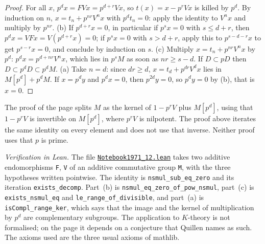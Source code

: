 \begin{proof}
For all $x$, $p^dx = FVx = p^{d+r}Vx$, so $t(x) = x - p^rVx$ is killed by $p^d$. By induction on $n$, $x = t_n + p^{nr}V^nx$ with $p^dt_n = 0$: apply the identity to $V^nx$ and multiply by $p^{nr}$. (b) If $p^{d+r}x = 0$, in particular if $p^sx = 0$ with $s \le d + r$, then $p^dx = VFx = V(p^{d+r}x) = 0$; if $p^sx = 0$ with $s > d + r$, apply this to $p^{s-d-r}x$ to get $p^{s-r}x = 0$, and conclude by induction on $s$. (c) Multiply $x = t_n + p^{nr}V^nx$ by $p^d$: $p^dx = p^{d+nr}V^nx$, which lies in $p^sM$ as soon as $nr \ge s - d$. If $D \subset pD$ then $D \subset p^dD \subset p^dM$. (a) Take $n = d$: since $dr \ge d$, $x = t_d + p^{dr}V^dx$ lies in $M[p^d] + p^dM$. If $x = p^dy$ and $p^dx = 0$, then $p^{2d}y = 0$, so $p^dy = 0$ by (b), that is $x = 0$.
\end{proof}

\noindent The proof of the page splits $M$ as the kernel of $1 - p^rV$ plus $M[p^d]$, using that $1 - p^rV$ is invertible on $M[p^d]$, where $p^rV$ is nilpotent. The proof above iterates the same identity on every element and does not use that inverse. Neither proof uses that $p$ is prime.

\emph{Verification in Lean.} The file \href{\leanblobmain/Notebook1971_12.lean}{\texttt{Notebook1971\_12.\allowbreak{}lean}} takes two additive endomorphisms \texttt{F}, \texttt{V} of an additive commutative group \texttt{M}, with the three hypotheses written pointwise. The identity is \texttt{nsmul\_sub\_eq\_zero} and its iteration \texttt{exists\_decomp}. Part~(b) is \texttt{nsmul\_eq\_zero\_of\_pow\_nsmul}, part~(c) is \texttt{exists\_nsmul\_eq} and \texttt{le\_range\_of\_divisible}, and part~(a) is \texttt{isCompl\_range\_ker}, which says that the image and the kernel of multiplication by $p^d$ are complementary subgroups. The application to $K$-theory is not formalised; on the page it depends on a conjecture that Quillen names as such. The axioms used are the three usual axioms of mathlib.

